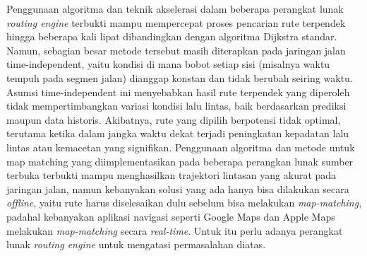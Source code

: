 Penggunaan algoritma dan teknik akselerasi dalam beberapa perangkat lunak \textit{routing engine} terbukti mampu mempercepat proses pencarian rute terpendek hingga beberapa kali lipat dibandingkan dengan algoritma Dijkstra standar. Namun, sebagian besar metode tersebut masih diterapkan pada jaringan jalan time-independent, yaitu kondisi di mana bobot setiap sisi (misalnya waktu tempuh pada segmen jalan) dianggap konstan dan tidak berubah seiring waktu. Asumsi time-independent ini menyebabkan hasil rute terpendek yang diperoleh tidak mempertimbangkan variasi kondisi lalu lintas, baik berdasarkan prediksi maupun data historis. Akibatnya, rute yang dipilih berpotensi tidak optimal, terutama ketika dalam jangka waktu dekat terjadi peningkatan kepadatan lalu lintas atau kemacetan yang signifikan. Penggunaan algoritma dan metode untuk map matching yang diimplementasikan pada beberapa perangkan lunak sumber terbuka terbukti mampu menghasilkan trajektori lintasan yang akurat pada jaringan jalan, namun kebanyakan solusi yang ada hanya bisa dilakukan secara \textit{offline}, yaitu rute harus diselesaikan dulu sebelum bisa melakukan \textit{map-matching}, padahal kebanyakan aplikasi navigasi seperti Google Maps dan Apple Maps melakukan \textit{map-matching} secara \textit{real-time}. Untuk itu perlu adanya perangkat lunak \textit{routing engine} untuk mengatasi permasalahan diatas.
